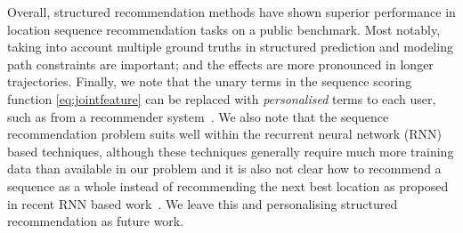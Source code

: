 

Overall, structured recommendation methods have shown superior performance in location sequence recommendation tasks on a public benchmark. Most notably, taking into account multiple ground truths in structured prediction and modeling path constraints are important; and the effects are more pronounced in longer trajectories.
Finally, we note that the unary terms in the sequence scoring function \eqref{eq:jointfeature} can be replaced with {\em personalised} terms to each user, such as from a recommender system~\cite{Koren:2009,bpr09}. 
We also note that the sequence recommendation problem suits well within the recurrent neural network (RNN) based techniques, 
although these techniques generally require much more training data than available in our problem and 
it is also not clear how to recommend a sequence as a whole instead of recommending the next best location as proposed in recent RNN based work~\cite{aaai16}.
We leave this and personalising structured recommendation as future work.


